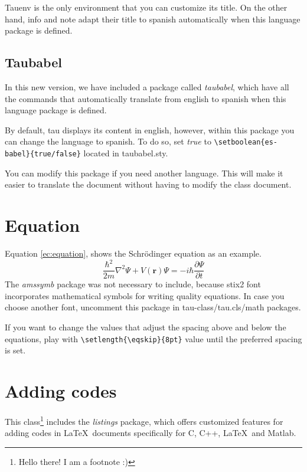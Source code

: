 \documentclass[9pt,a4paper,twoside]{tau-class/tau}
\begin{document}
        Tauenv is the only environment that you can customize its title. On the other hand, info and note adapt their title to spanish automatically when this language package is defined.
		
    \subsection{Taubabel}

        In this new version, we have included a package called \textit{taubabel}, which have all the commands that automatically translate from english to spanish when this language package is defined.
		
        By default, tau displays its content in english, however, within this package you can change the language to spanish. To do so, set \textit{true} to \verb|\setboolean{es-babel}{true/false}| located in taubabel.sty.
		
        You can modify this package if you need another language. This will make it easier to translate the document without having to modify the class document.
		
\section{Equation}

    Equation \ref{ec:equation}, shows the Schrödinger equation as an example. 
	\begin{equation} \label{ec:equation}
		\frac{\hbar^2}{2m}\nabla^2\Psi + V(\mathbf{r})\Psi = -i\hbar \frac{\partial\Psi}{\partial t}
	\end{equation} 
    The \textit{amssymb} package was not necessary to include, because stix2 font incorporates mathematical symbols for writing quality equations. In case you choose another font, uncomment this package in tau-class/tau.cls/math packages.
	
    If you want to change the values that adjust the spacing above and below the equations, play with \verb|\setlength{\eqskip}{8pt}| value until the preferred spacing is set.
	
\section{Adding codes}
	
    This class\footnote{Hello there! I am a footnote :)} includes the \textit{listings} package, which offers customized features for adding codes in \LaTeX\ documents specifically for C, C++, \LaTeX\ and Matlab. 
	
\end{document}
